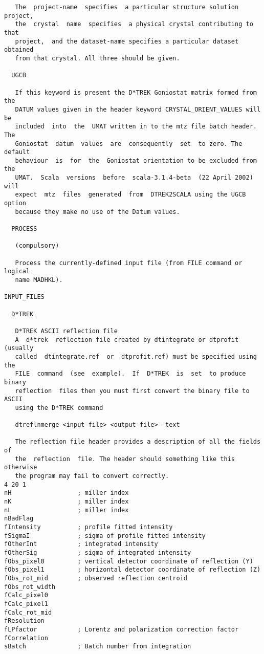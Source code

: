 \documentclass[a4paper, 11pt]{article}
\begin{document}
{\begin{verbatim}
   The  project-name  specifies  a particular structure solution project,
   the  crystal  name  specifies  a physical crystal contributing to that
   project,  and the dataset-name specifies a particular dataset obtained
   from that crystal. All three should be given.

  UGCB

   If this keyword is present the D*TREK Goniostat matrix formed from the
   DATUM values given in the header keyword CRYSTAL_ORIENT_VALUES will be
   included  into  the  UMAT written in to the mtz file batch header. The
   Goniostat  datum  values  are  consequently  set  to zero. The default
   behaviour  is  for  the  Goniostat orientation to be excluded from the
   UMAT.  Scala  versions  before  scala-3.1.4-beta  (22 April 2002) will
   expect  mtz  files  generated  from  DTREK2SCALA using the UGCB option
   because they make no use of the Datum values.

  PROCESS

   (compulsory)

   Process the currently-defined input file (from FILE command or logical
   name MADHKL).

INPUT_FILES

  D*TREK

   D*TREK ASCII reflection file
   A  d*trek  reflection file created by dtintegrate or dtprofit (usually
   called  dtintegrate.ref  or  dtprofit.ref) must be specified using the
   FILE  command  (see  example).  If  D*TREK  is  set  to produce binary
   reflection  files then you must first convert the binary file to ASCII
   using the D*TREK command

   dtreflnmerge <input-file> <output-file> -text

   The reflection file header provides a description of all the fields of
   the  reflection  file. The header should something like this otherwise
   the program may fail to convert correctly.
4 20 1
nH                  ; miller index
nK                  ; miller index
nL                  ; miller index
nBadFlag
fIntensity          ; profile fitted intensity
fSigmaI             ; sigma of profile fitted intensity
fOtherInt           ; integrated intensity
fOtherSig           ; sigma of integrated intensity
fObs_pixel0         ; vertical detector coordinate of reflection (Y)
fObs_pixel1         ; horizontal detector coordinate of reflection (Z)
fObs_rot_mid        ; observed reflection centroid
fObs_rot_width
fCalc_pixel0
fCalc_pixel1
fCalc_rot_mid
fResolution
fLPfactor           ; Lorentz and polarization correction factor
fCorrelation
sBatch              ; Batch number from integration


\end{verbatim}}
\end{document}
